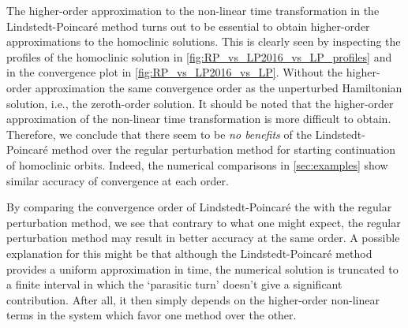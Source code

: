The higher-order approximation to the non-linear time transformation in the
Lindstedt-Poincar\'e method turns out to be essential to obtain higher-order
approximations to the homoclinic solutions. This is clearly seen by inspecting
the profiles of the homoclinic solution in
\cref{fig:RP_vs_LP2016_vs_LP_profiles} and in the convergence plot in
\cref{fig:RP_vs_LP2016_vs_LP}. Without the higher-order approximation the same
convergence order as the unperturbed Hamiltonian solution, i.e., the
zeroth-order solution. It should be noted that the higher-order approximation
of the non-linear time transformation is more difficult to obtain. Therefore,
we conclude that there seem to be \emph{no benefits} of the
Lindstedt-Poincar\'e method over the regular perturbation method for starting
continuation of homoclinic orbits. Indeed, the numerical comparisons in
\cref{sec:examples} show similar accuracy of convergence at each order.

By comparing the convergence order of Lindstedt-Poincar\'e the with the regular
perturbation method, we see that contrary to what one might expect, the
regular perturbation method may result in better accuracy at the same order. A
possible explanation for this might be that although the Lindstedt-Poincar\'e
method provides a uniform approximation in time, the numerical solution is
truncated to a finite interval in which the `parasitic turn' doesn't give a
significant contribution. After all, it then simply depends on the higher-order
non-linear terms in the system which favor one method over the other. 

